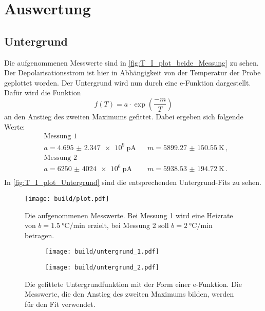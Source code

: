 \section{Auswertung}
\label{sec:Auswertung}

\subsection{Untergrund}
  Die aufgenommenen Messwerte sind in \autoref{fig:T_I_plot_beide_Messung} zu sehen.
  Der Depolarisationsstrom ist hier in Abhängigkeit von der Temperatur der Probe geplottet worden.
  Der Untergrund wird nun durch eine e-Funktion dargestellt.
  Dafür wird die Funktion
  \begin{equation*}
    f(T) = a \cdot \exp(\frac{-m}{T})
  \end{equation*}
  an den Anstieg des zweiten Maximums gefittet.
  Dabei ergeben sich folgende Werte:
  \begin{align*}
    &\text{Messung 1}\\
    &a =  \SI{4.695(2347)e9}{\pico\ampere} &&  m = \SI{5899.27(15055)}{\kelvin} \, ,\\
    &\text{Messung 2}\\
    &a = \SI{6250(4024)e6}{\pico\ampere} &&  m = \SI{5938.53(19472)}{\kelvin} \, .\\ %
  \end{align*}
  In \autoref{fig:T_I_plot_Untergrund} sind die entsprechenden Untergrund-Fits zu sehen.

  \begin{figure}[H]
    \centering
    \texttt{[image: build/plot.pdf]}
    \caption{Die aufgenommenen Messwerte. Bei Messung 1 wird eine Heizrate von $b = \SI{1.5}{\celsius\per\minute}$ erzielt, 
    bei Messung 2 soll $b = \SI{2}{\celsius\per\minute}$ betragen.}
    \label{fig:T_I_plot_beide_Messung}
  \end{figure} %

  \begin{figure}[H]
    \begin{subfigure}[b]{.5\linewidth}
      \centering
      \texttt{[image: build/untergrund\_1.pdf]}
    \end{subfigure}
    \begin{subfigure}[b]{.5\linewidth}
      \centering
      \texttt{[image: build/untergrund\_2.pdf]}
    \end{subfigure}
    
    \caption{Die gefittete Untergrundfunktion mit der Form einer e-Funktion.
      Die Messwerte, die den Anstieg des zweiten Maximums bilden, werden für den Fit verwendet.}
    \label{fig:T_I_plot_Untergrund}
  \end{figure} %

